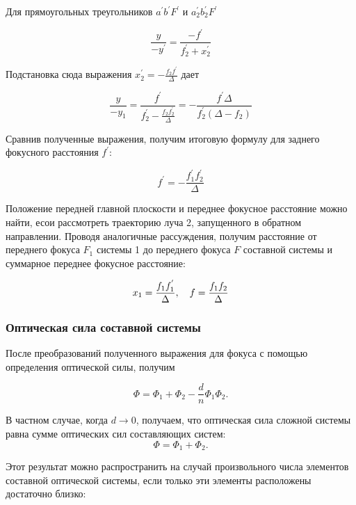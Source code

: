 Для прямоугольных треугольников $a^{'}b^{'}F^{'}$ и $a_2^{'}b_2^{'}F^{'}$

\begin{equation*}
    \frac{y}{-y^{'}} = \frac{-f^{'}}{f_2^{'} +x_2^{'}}
\end{equation*}

Подстановка сюда выражения $x_2^{'} = -\frac{f_2f^{'}}{\Delta}$ дает

\begin{equation*}
    \frac{y}{-y_1} = \frac{f^{'}}{f_2^{'} - \frac{f_2f_2^{'}}{\Delta}} = -\frac{f^{'}\Delta}{f_2^{'}(\Delta-f_2)}
\end{equation*}


Сравнив полученные выражения, получим итоговую формулу для заднего фокусного расстояния $f^{'}$:

\begin{equation*}
    f^{'} = -\frac{f_1^{'}f_2^{'}}{\Delta}
\end{equation*}

Положение передней главной плоскости и переднее фокусное расстояние можно найти, есои рассмотреть траекторию луча 2, запущенного в обратном направлении. Проводя аналогичные рассуждения, получим расстояние от переднего фокуса $F_1$ системы 1 до переднего фокуса $F$ составной системы и суммарное переднее фокусное расстояние:

\begin{equation*}
    x_1 = \frac{f_1f_1^{'}}{\Delta}, \hspace{10px} f=\frac{f_1f_2}{\Delta}
\end{equation*}
\subsubsection{Оптическая сила составной системы}

После преобразований полученного выражения для фокуса с помощью определения оптической силы, получим

\begin{equation*}
    \Phi = \Phi_1 + \Phi_2 -\frac{d}{n}\Phi_1\Phi_2.
\end{equation*}

В частном случае, когда $d \rightarrow 0$, получаем, что оптическая сила сложной системы равна сумме оптических сил составляющих систем:
\begin{equation*}
    \Phi = \Phi_1 + \Phi_2.
\end{equation*}

Этот результат можно распространить на случай произвольного числа элементов составной оптической системы, если только эти элементы расположены достаточно близко:

